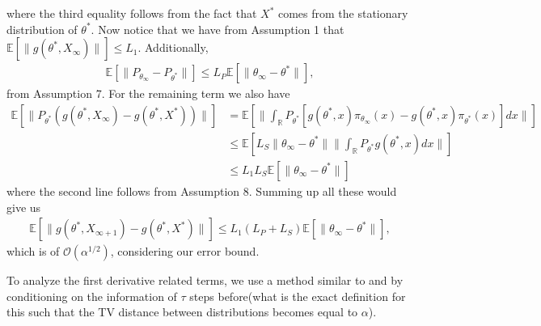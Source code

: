 \documentclass[a4paper]{article}
\newcommand{\norm}[1]{\|#1 \|}
\newcommand{\Exs}{\mathbb{E}}
\newcommand{\thetastar}{\theta^*}
\newcommand{\thetainf}{\theta_\infty}
\newcommand{\xstar}{X^*}
\newcommand{\xinf}{X_{\infty}}
\newcommand{\xinfPone}{X_{\infty + 1}}
\newcommand{\stepsize}{\alpha}
\begin{document}
	 where the third equality follows from the fact that $\xstar$ comes from the stationary distribution of $\thetastar$. Now notice that we have from Assumption 1 that $\Exs\left[\norm{g\left(\thetastar, \xinf\right)}\right] \leq L_{1}$. Additionally,
	 \begin{align*}
	 	\Exs\left[\norm{P_{\thetainf} - P_{\thetastar}}\right] \leq L_{P}\Exs\left[\norm{\thetainf - \thetastar}\right],
	 \end{align*}
	 from Assumption 7. For the remaining term we also have
	 \begin{align*}
	 	\Exs\left[\norm{P_{\thetastar}\left(g\left(\thetastar, \xinf\right) - g\left(\thetastar, \xstar\right)\right)}\right] &= \Exs\left[\norm{\int_{\mathbb{R}}P_{\thetastar}\left[g\left(\thetastar, x\right)\pi_{\thetainf}(x) - g\left(\thetastar, x\right)\pi_{\thetastar}(x)\right] dx}\right]\\
	 	& \leq \Exs\left[L_{S}\norm{\thetainf - \thetastar}\norm{\int_{\mathbb{R}}P_{\thetastar}g\left(\thetastar, x\right)dx}\right]\\
	 	& \leq L_{1}L_{S}\Exs\left[\norm{\thetainf - \thetastar}\right]
	 \end{align*}
	 where the second line follows from Assumption 8. Summing up all these would give us
	 \begin{align*}
	 	\Exs\left[\norm{g\left(\thetastar, \xinfPone\right) - g\left(\thetastar, \xstar\right)}\right] \leq L_{1}\left(L_{P} + L_{S}\right)\Exs\left[\norm{\thetainf - \thetastar}\right],
	 \end{align*}
	 which is of $\mathcal{O}(\stepsize^{1 / 2})$, considering our error bound.
	 
	 To analyze the first derivative related terms, we use a method similar to \cite{wu2020finite} and \cite{zou2019finite} by conditioning on the information of $\tau$ steps before(what is the exact definition for this such that the TV distance between distributions becomes equal to $\alpha$).
\end{document}
